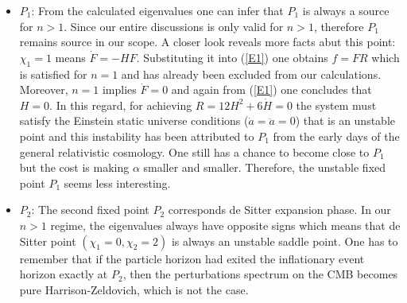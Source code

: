 \documentclass[a4paper,11pt]{article}
\begin{document}
\begin{itemize}
\item $P_1$:  From the calculated eigenvalues one can infer that $P_1$ is always a source for $n>1$. Since our entire discussions is only valid for $n>1$, therefore $P_1$ remains source in our scope. A closer look reveals more facts abut this point: $\chi_1=1$ means $\dot{F}=-H F$. Substituting it into (\ref{E1}) one obtains $f=F R$ which is satisfied for $n=1$ and has already been excluded from our calculations. Moreover, $n=1$ implies $\dot{F}=0$ and again from (\ref{E1}) one concludes that $H=0$. In this regard, for achieving $R=12 H^2+6\dot{H}=0$ the system must satisfy the Einstein static universe conditions ($\dot{a}=\ddot{a}=0$) that is an unstable point and this instability has been attributed to $P_1$ from the early days of  the general relativistic cosmology. One still has a chance to become close to $P_1$ but the cost is making $\alpha$ smaller and smaller. Therefore, the unstable fixed point $P_1$ seems less interesting.  


\item $P_2$: The second fixed point $P_2$ corresponds de Sitter expansion phase. In our $n>1$ regime, the eigenvalues always have opposite signs which means that de Sitter point $(\chi_1=0,\chi_2=2)$ is always an unstable saddle point. One has to remember that if the particle horizon had exited the inflationary event horizon exactly at $P_2$, then the perturbations spectrum on the CMB becomes pure Harrison-Zeldovich, which is not the case. 


\end{itemize}
\end{document}
